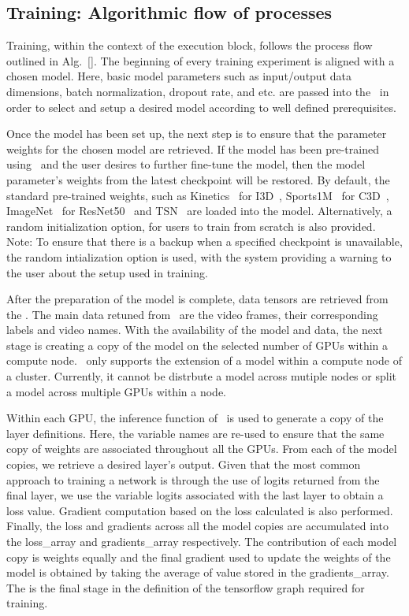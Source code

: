 \documentclass{llncs}
\begin{document}
\subsection{Training: Algorithmic flow of processes}
\label{sec:training}
Training, within the context of the execution block, follows the process flow outlined in Alg.~\ref{}.
The beginning of every training experiment is aligned with a chosen model. 
Here, basic model parameters such as input/output data dimensions, batch normalization, dropout rate, and etc. are passed into the \model~in order to select and setup a desired model according to well defined prerequisites.

Once the model has been set up, the next step is to ensure that the parameter weights for the chosen model are retrieved. 
If the model has been pre-trained using \acro~and the user desires to further fine-tune the model, then the model parameter's weights from the latest checkpoint will be restored.
By default, the standard pre-trained weights, such as Kinetics~\cite{} for I3D~\cite{}, Sports1M~\cite{} for C3D~\cite{}, ImageNet~\cite{} for ResNet50~\cite{} and TSN~\cite{} are loaded into the model.
Alternatively, a random initialization option, for users to train from scratch is also provided. \\
Note: To ensure that there is a backup when a specified checkpoint is unavailable, the random intialization option is used, with the system providing a warning to the user about the setup used in training.

After the preparation of the model is complete, data tensors are retrieved from the \data.
The main data retuned from \data~are the video frames, their corresponding labels and video names.
With the availability of the model and data, the next stage is creating a copy of the model on the selected number of GPUs within a compute node.
\acro~only supports the extension of a model within a compute node of a cluster. 
Currently, it cannot be distrbute a model across mutiple nodes or split a model across multiple GPUs within a node.

Within each GPU, the inference function of \model~is used to generate a copy of the layer definitions. 
Here, the variable names are re-used to ensure that the same copy of weights are associated throughout all the GPUs.
From each of the model copies, we retrieve a desired layer's output. 
Given that the most common approach to training a network is through the use of logits returned from the final layer, we use the variable logits associated with the last layer to obtain a loss value.
Gradient computation based on the loss calculated is also performed.
Finally, the loss and gradients across all the model copies are accumulated into the loss\_array and gradients\_array respectively.
The contribution of each model copy is weights equally and the final gradient used to update the weights of the model is obtained by taking the average of value stored in the gradients\_array.
The is the final stage in the definition of the tensorflow graph required for training.
\end{document}
